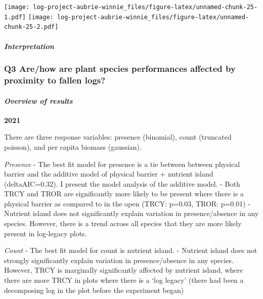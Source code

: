 \documentclass[
]{article}
\begin{document}
\texttt{[image: log-project-aubrie-winnie\_files/figure-latex/unnamed-chunk-25-1.pdf]}
\texttt{[image: log-project-aubrie-winnie\_files/figure-latex/unnamed-chunk-25-2.pdf]}

\hypertarget{interpretation}{%
\paragraph{\texorpdfstring{\emph{Interpretation}}{Interpretation}}\label{interpretation}}

\hypertarget{q3-arehow-are-plant-species-performances-affected-by-proximity-to-fallen-logs}{%
\subsubsection{\texorpdfstring{\textbf{Q3 Are/how are plant species
performances affected by proximity to fallen
logs?}}{Q3 Are/how are plant species performances affected by proximity to fallen logs? }}\label{q3-arehow-are-plant-species-performances-affected-by-proximity-to-fallen-logs}}

\hypertarget{overview-of-results-2}{%
\paragraph{\texorpdfstring{\emph{Overview of results}
}{Overview of results  }}\label{overview-of-results-2}}

\textbf{2021}

There are three response variables: presence (binomial), count
(truncated poisson), and per capita biomass (gaussian).

\emph{Presence} - The best fit model for presence is a tie between
between physical barrier and the additive model of physical barrier +
nutrient island (deltaAIC=0.32). I present the model analysis of the
additive model. - Both TRCY and TROR are significantly more likely to be
present where there is a physical barrier as compared to in the open
(TRCY: p=0.03, TROR: p=0.01) - Nutrient island does not significantly
explain variation in presence/absence in any species. However, there is
a trend across all species that they are more likely present in
log-legacy plots.

\emph{Count} - The best fit model for count is nutrient island. -
Nutrient island does not strongly significantly explain variation in
presence/absence in any species. However, TRCY is marginally
significantly affected by nutrient island, where there are more TRCY in
plots where there is a `log legacy' (there had been a decomposing log in
the plot before the experiment began)
\end{document}
